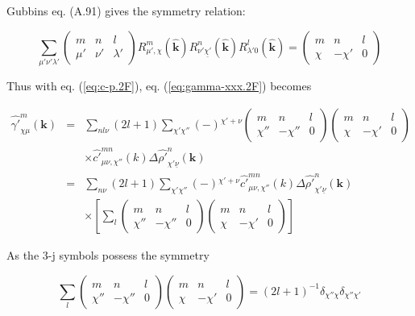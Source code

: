Gubbins eq. (A.91) gives the symmetry relation:

\begin{equation}
\sum_{\mu'\nu'\lambda'}\left(\begin{array}{ccc}
m & n & l\\
\mu' & \nu' & \lambda'
\end{array}\right)R_{\mu',\chi}^{m}(\hat{\mathbf{k}})R_{\nu'\underline{\chi'}}^{n}(\hat{\mathbf{k}})R_{\lambda'0}^{l}(\hat{\mathbf{k}})=\left(\begin{array}{ccc}
m & n & l\\
\chi & -\chi' & 0
\end{array}\right)\label{eq:gg.a91.2F}
\end{equation}

Thus with eq. (\ref{eq:c-p.2F}), eq. (\ref{eq:gamma-xxx.2F}) becomes

\begin{eqnarray}
\hat{\gamma'}_{\chi\mu}^{m}(\mathbf{k}) & = & \sum_{nl\nu}\left(2l+1\right)\sum_{\chi'\chi''}\left(-\right){}^{\chi'+\nu}\left(\begin{array}{ccc}
m & n & l\\
\chi'' & -\chi'' & 0
\end{array}\right)\left(\begin{array}{ccc}
m & n & l\\
\chi & -\chi' & 0
\end{array}\right)\label{eq:gamma-xxx-1.2F}\\
 &  & \times\hat{c'}_{\mu\nu,\chi''}^{mn}(k)\Delta\hat{\rho'}_{\chi'\underline{\nu}}^{n}(\mathbf{k})\nonumber \\
 & = & \sum_{n\nu}\left(2l+1\right)\sum_{\chi'\chi''}\left(-\right){}^{\chi'+\nu}\hat{c'}_{\mu\nu,\chi''}^{mn}(k)\Delta\hat{\rho'}_{\chi'\underline{\nu}}^{n}(\mathbf{k})\\
 &  & \times\left[\sum_{l}\left(\begin{array}{ccc}
m & n & l\\
\chi'' & -\chi'' & 0
\end{array}\right)\left(\begin{array}{ccc}
m & n & l\\
\chi & -\chi' & 0
\end{array}\right)\right]\nonumber 
\end{eqnarray}

As the 3-j symbols possess the symmetry \citep{Messiah}

\begin{equation}
\sum_{l}\left(\begin{array}{ccc}
m & n & l\\
\chi'' & -\chi'' & 0
\end{array}\right)\left(\begin{array}{ccc}
m & n & l\\
\chi & -\chi' & 0
\end{array}\right)=\left(2l+1\right)^{-1}\delta_{\chi''\chi}\delta_{\chi''\chi'}
\end{equation}

